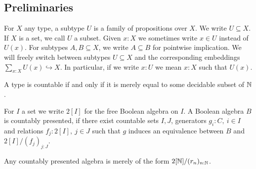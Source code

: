 \subsection{Preliminaries}
%
\begin{remark}
  For $X$ any type, a subtype $U$ is a family of propositions over $X$. 
  We write $U\subseteq X$.
  If $X$ is a set, we call $U$ a subset. Given $x:X$ we sometimes write $x\in U$ instead of $U(x)$. %
  For subtypes $A,B\subseteq X$, we write $A\subseteq B$ for pointwise implication.
  We will freely switch between subtypes $U\subseteq X$ %
  and the corresponding embeddings
  $
    \sum_{x:X}U(x) \hookrightarrow  X.
  $
In particular, if we write $x: U$ we mean $x:X$ such that $U(x)$.
\end{remark}
\begin{definition}
  A type is countable if and only if it is 
  merely equal to some decidable subset of $\mathbb{N}$. 
\end{definition}

\begin{definition}
  For $I$ a set we write $2[I]$ for the free Boolean algebra on $I$.
  A Boolean algebra $B$ is countably presented,
  if there exist countable sets $I,J$, 
  generators $g_i:C,~{i\in I}$ and relations $f_j:2[I],~{j\in J}$ 
  such that $g$ induces an equivalence between $B$ and $2[I]/(f_j)_{j:J}$.
\end{definition} 

\begin{remark}\label{BooleAsCQuotient}
Any countably presented algebra is merely of the form 
$2[\mathbb{N}]/ (r_n)_{n:\mathbb{N}}$.
\end{remark}



